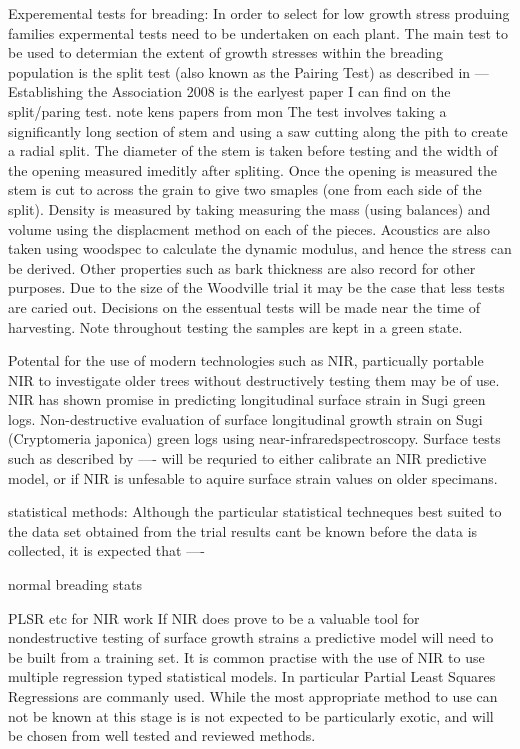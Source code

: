 \documentclass{article}
\begin{document}
Experemental tests for breading:
In order to select for low growth stress produing families expermental tests
need to be undertaken on each plant. The main test to be used to determian the
extent of growth stresses within the breading population is the split test
(also known as the Pairing Test) as described in ---
Establishing the Association 2008 is the earlyest paper I can find on the split/paring test. note kens papers from
mon
The test involves taking a significantly long section of stem and using a saw
cutting along the pith to create a radial split. The diameter of the stem is
taken before testing and the width of the opening measured imeditly after
spliting. Once the opening is measured the stem is cut to across the
grain to give two smaples (one from each side of the split). Density is
measured by taking measuring the mass (using balances) and volume using the
displacment method on each of the pieces. Acoustics are also taken using woodspec
to calculate the dynamic modulus, and hence the stress can be derived. Other
properties such as bark thickness are also record for other purposes. Due to
the size of the Woodville trial it may be the case that less tests are caried
out. Decisions on the essentual tests will be made near the time of harvesting.
Note throughout testing the samples are kept in a green state.

Potental for the use of modern technologies such as NIR, particually portable NIR
to investigate older trees without destructively testing them may be of use. NIR
has shown promise in predicting longitudinal surface strain in Sugi green logs.
Non-destructive evaluation of surface longitudinal growth strain
on Sugi (Cryptomeria japonica) green logs using near-infraredspectroscopy.
Surface tests such as described by ---- will be requried to either calibrate an
NIR predictive model, or if NIR is unfesable to aquire surface strain values on
older specimans.

statistical methods:
Although the particular statistical techneques best suited to the data set
obtained from the trial results cant be known before the data is collected, it
is expected that ----

normal breading stats

PLSR etc for NIR work
If NIR does prove to be a valuable tool for nondestructive testing of surface
growth strains a predictive model will need to be built from a training set. It
is common practise with the use of NIR to use multiple regression typed
statistical models. In particular Partial Least Squares Regressions are
commanly used. While the most appropriate method to use can not be known at this stage is
is not expected to be particularly exotic, and will be chosen from well tested
and reviewed methods.
\end{document}
